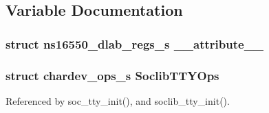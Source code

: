\subsection{Variable Documentation}
\hypertarget{soclib-tty_8h_a1d3bdc9d877594ceaf22370e6cb9a58a}{
\subsubsection[{\-\_\-\-\_\-attribute\-\_\-\-\_\-}]{\setlength{\rightskip}{0pt plus 5cm}struct {\bf ns16550\-\_\-dlab\-\_\-regs\-\_\-s} \-\_\-\-\_\-attribute\-\_\-\-\_\-}}\label{soclib-tty_8h_a1d3bdc9d877594ceaf22370e6cb9a58a}
\hypertarget{soclib-tty_8h_ac60ea3e14652d47e0814fac85c18b2ff}{
\subsubsection[{Soclib\-T\-T\-Y\-Ops}]{\setlength{\rightskip}{0pt plus 5cm}struct {\bf chardev\-\_\-ops\-\_\-s} Soclib\-T\-T\-Y\-Ops}}\label{soclib-tty_8h_ac60ea3e14652d47e0814fac85c18b2ff}


Referenced by soc\-\_\-tty\-\_\-init(), and soclib\-\_\-tty\-\_\-init().

